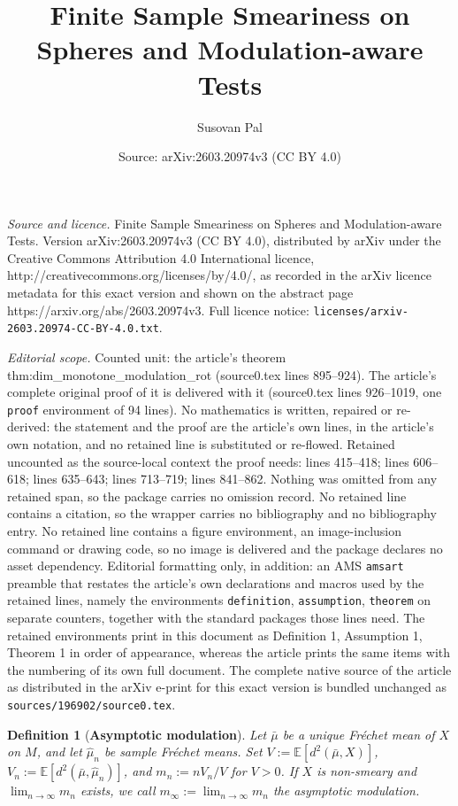 \documentclass[10pt,a4paper]{amsart}
\title{Finite Sample Smeariness on Spheres and Modulation-aware Tests}
\author{Susovan Pal}
\date{Source: arXiv:2603.20974v3 (CC BY 4.0)}
\newtheorem{definition}{Definition}
\newcommand{\mubar}{\bar{\mu}}
\begin{document}
\maketitle

\noindent\emph{Source and licence.} Finite Sample Smeariness on Spheres and Modulation-aware Tests. Version arXiv:2603.20974v3 (CC BY 4.0), distributed by arXiv under the Creative Commons Attribution 4.0 International licence, http://creativecommons.org/licenses/by/4.0/, as recorded in the arXiv licence metadata for this exact version and shown on the abstract page https://arxiv.org/abs/2603.20974v3. Full licence notice: \texttt{licenses/arxiv-2603.20974-CC-BY-4.0.txt}.\par\smallskip

\noindent\textit{Editorial scope.} Counted unit: the article's theorem thm:dim\_monotone\_modulation\_rot (source0.tex lines 895--924). The article's complete original proof of it is delivered with it (source0.tex lines 926--1019, one \texttt{proof} environment of 94 lines). No mathematics is written, repaired or re-derived: the statement and the proof are the article's own lines, in the article's own notation, and no retained line is substituted or re-flowed.  Retained uncounted as the source-local context the proof needs: lines 415--418; lines 606--618; lines 635--643; lines 713--719; lines 841--862.  Nothing was omitted from any retained span, so the package carries no omission record.  No retained line contains a citation, so the wrapper carries no bibliography and no bibliography entry.  No retained line contains a figure environment, an image-inclusion command or drawing code, so no image is delivered and the package declares no asset dependency.  Editorial formatting only, in addition: an AMS \texttt{amsart} preamble that restates the article's own declarations and macros used by the retained lines, namely the environments \texttt{definition}, \texttt{assumption}, \texttt{theorem} on separate counters, together with the standard packages those lines need.  The retained environments print in this document as Definition 1, Assumption 1, Theorem 1 in order of appearance, whereas the article prints the same items with the numbering of its own full document.  The complete native source of the article as distributed in the arXiv e-print for this exact version is bundled unchanged as \texttt{sources/196902/source0.tex}.
\begin{definition}[\textbf{Asymptotic modulation}]
\label{def:asymptotic_modulation}
Let \(\mubar\) be a unique Fr\'echet mean of \(X\) on \(M\), and let \(\hat\mu_n\) be sample Fr\'echet means. Set \(V:=\mathbb E[d^2(\mubar,X)]\), \(V_n:=\mathbb E[d^2(\mubar,\hat\mu_n)]\), and \(m_n:=nV_n/V\) for \(V>0\).  If \(X\) is non-smeary and \(\lim_{n\to\infty}m_n\) exists, we call \(m_\infty:=\lim_{n\to\infty}m_n\) the \emph{asymptotic modulation}.
\end{definition}
\end{document}
